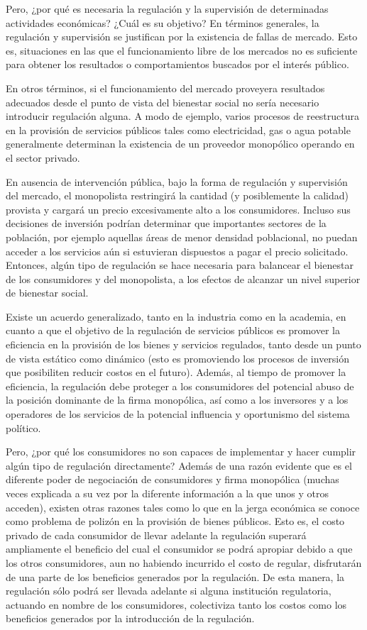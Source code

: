 \documentclass[
  12pt,
  spanish,
]{book}
\begin{document}
Pero, ¿por qué es necesaria la regulación y la supervisión de
determinadas actividades económicas? ¿Cuál es su objetivo? En términos
generales, la regulación y supervisión se justifican por la existencia
de fallas de mercado. Esto es, situaciones en las que el funcionamiento
libre de los mercados no es suficiente para obtener los resultados o
comportamientos buscados por el interés público.

En otros términos, si el funcionamiento del mercado proveyera resultados
adecuados desde el punto de vista del bienestar social no sería
necesario introducir regulación alguna. A modo de ejemplo, varios
procesos de reestructura en la provisión de servicios públicos tales
como electricidad, gas o agua potable generalmente determinan la
existencia de un proveedor monopólico operando en el sector privado.

En ausencia de intervención pública, bajo la forma de regulación y
supervisión del mercado, el monopolista restringirá la cantidad (y
posiblemente la calidad) provista y cargará un precio excesivamente alto
a los consumidores. Incluso sus decisiones de inversión podrían
determinar que importantes sectores de la población, por ejemplo
aquellas áreas de menor densidad poblacional, no puedan acceder a los
servicios aún si estuvieran dispuestos a pagar el precio solicitado.
Entonces, algún tipo de regulación se hace necesaria para balancear el
bienestar de los consumidores y del monopolista, a los efectos de
alcanzar un nivel superior de bienestar social.

Existe un acuerdo generalizado, tanto en la industria como en la
academia, en cuanto a que el objetivo de la regulación de servicios
públicos es promover la eficiencia en la provisión de los bienes y
servicios regulados, tanto desde un punto de vista estático como
dinámico (esto es promoviendo los procesos de inversión que posibiliten
reducir costos en el futuro). Además, al tiempo de promover la
eficiencia, la regulación debe proteger a los consumidores del potencial
abuso de la posición dominante de la firma monopólica, así como a los
inversores y a los operadores de los servicios de la potencial
influencia y oportunismo del sistema político.

Pero, ¿por qué los consumidores no son capaces de implementar y hacer
cumplir algún tipo de regulación directamente? Además de una razón
evidente que es el diferente poder de negociación de consumidores y
firma monopólica (muchas veces explicada a su vez por la diferente
información a la que unos y otros acceden), existen otras razones tales
como lo que en la jerga económica se conoce como problema de polizón en
la provisión de bienes públicos. Esto es, el costo privado de cada
consumidor de llevar adelante la regulación superará ampliamente el
beneficio del cual el consumidor se podrá apropiar debido a que los
otros consumidores, aun no habiendo incurrido el costo de regular,
disfrutarán de una parte de los beneficios generados por la regulación.
De esta manera, la regulación sólo podrá ser llevada adelante si alguna
institución regulatoria, actuando en nombre de los consumidores,
colectiviza tanto los costos como los beneficios generados por la
introducción de la regulación.
\end{document}
